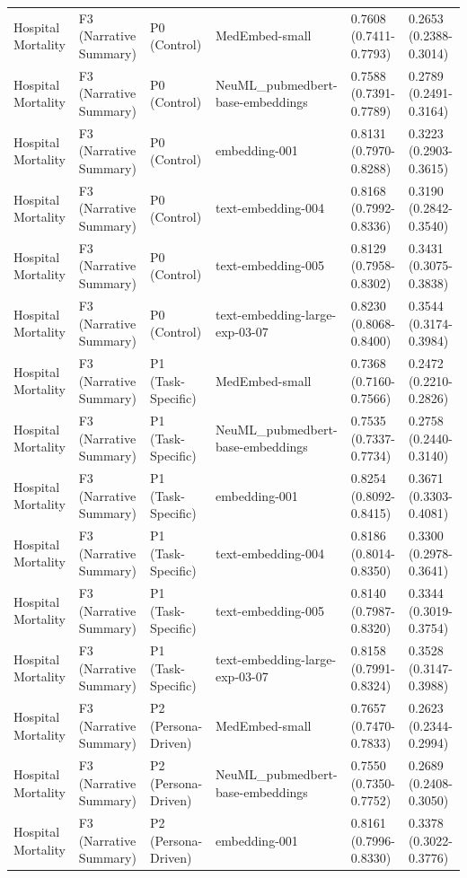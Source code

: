 \begin{tabular}{llllll}
Hospital Mortality & F3 (Narrative Summary) & P0 (Control) & MedEmbed-small & 0.7608 (0.7411-0.7793) & 0.2653 (0.2388-0.3014) \\
Hospital Mortality & F3 (Narrative Summary) & P0 (Control) & NeuML\_pubmedbert-base-embeddings & 0.7588 (0.7391-0.7789) & 0.2789 (0.2491-0.3164) \\
Hospital Mortality & F3 (Narrative Summary) & P0 (Control) & embedding-001 & 0.8131 (0.7970-0.8288) & 0.3223 (0.2903-0.3615) \\
Hospital Mortality & F3 (Narrative Summary) & P0 (Control) & text-embedding-004 & 0.8168 (0.7992-0.8336) & 0.3190 (0.2842-0.3540) \\
Hospital Mortality & F3 (Narrative Summary) & P0 (Control) & text-embedding-005 & 0.8129 (0.7958-0.8302) & 0.3431 (0.3075-0.3838) \\
Hospital Mortality & F3 (Narrative Summary) & P0 (Control) & text-embedding-large-exp-03-07 & 0.8230 (0.8068-0.8400) & 0.3544 (0.3174-0.3984) \\
Hospital Mortality & F3 (Narrative Summary) & P1 (Task-Specific) & MedEmbed-small & 0.7368 (0.7160-0.7566) & 0.2472 (0.2210-0.2826) \\
Hospital Mortality & F3 (Narrative Summary) & P1 (Task-Specific) & NeuML\_pubmedbert-base-embeddings & 0.7535 (0.7337-0.7734) & 0.2758 (0.2440-0.3140) \\
Hospital Mortality & F3 (Narrative Summary) & P1 (Task-Specific) & embedding-001 & 0.8254 (0.8092-0.8415) & 0.3671 (0.3303-0.4081) \\
Hospital Mortality & F3 (Narrative Summary) & P1 (Task-Specific) & text-embedding-004 & 0.8186 (0.8014-0.8350) & 0.3300 (0.2978-0.3641) \\
Hospital Mortality & F3 (Narrative Summary) & P1 (Task-Specific) & text-embedding-005 & 0.8140 (0.7987-0.8320) & 0.3344 (0.3019-0.3754) \\
Hospital Mortality & F3 (Narrative Summary) & P1 (Task-Specific) & text-embedding-large-exp-03-07 & 0.8158 (0.7991-0.8324) & 0.3528 (0.3147-0.3988) \\
Hospital Mortality & F3 (Narrative Summary) & P2 (Persona-Driven) & MedEmbed-small & 0.7657 (0.7470-0.7833) & 0.2623 (0.2344-0.2994) \\
Hospital Mortality & F3 (Narrative Summary) & P2 (Persona-Driven) & NeuML\_pubmedbert-base-embeddings & 0.7550 (0.7350-0.7752) & 0.2689 (0.2408-0.3050) \\
Hospital Mortality & F3 (Narrative Summary) & P2 (Persona-Driven) & embedding-001 & 0.8161 (0.7996-0.8330) & 0.3378 (0.3022-0.3776) \\

\end{tabular}
